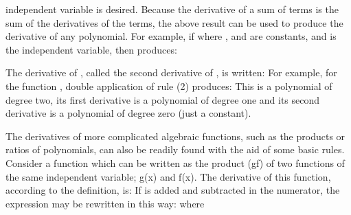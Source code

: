 {{independent variable is desired.
Because the derivative of a sum of terms is the sum of the derivatives of
the terms, the above result can be used to produce the derivative of any
polynomial.
%
%
For example, if
%
%
where ,  and  are constants, and  is the independent
variable, then  produces:
%
}%
%
\par{The derivative of , called the second derivative of , is
written:
%
%
For example, for the function , double
application of rule (2) produces:
%
%
This  is a polynomial of degree two, its first derivative is a
polynomial of degree one and its second derivative is a polynomial of degree
zero (just a constant).}%
%
\par{The derivatives of more complicated algebraic functions, such as the
products or ratios of polynomials, can also be readily found with the aid of
some basic rules.
Consider a function which can be written as the product (gf) of two
functions of the same independent variable; g(x) and f(x).
The derivative of this function, according to the definition, is:
%
%
If  is added and subtracted in the numerator, the
expression may be rewritten in this way:
%
%
where
}}
